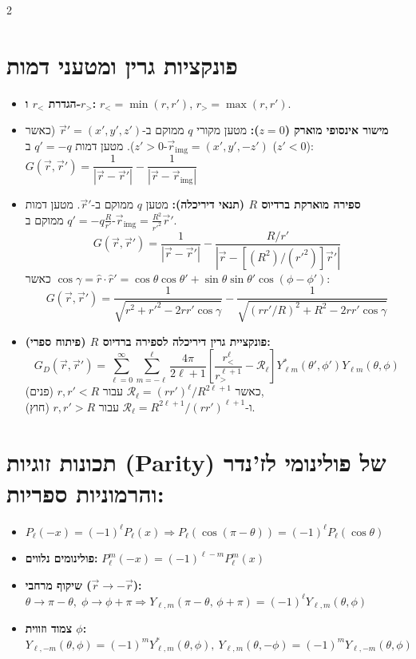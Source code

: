 \documentclass[10pt,a4paper]{article}
\begin{document}
\begin{multicols*}{2}
\section{פונקציות גרין ומטעני דמות}
\begin{itemize}
    \item \textbf{הגדרת $r_<$ ו-$r_>$:} $r_< = \min(r, r')$, \quad $r_> = \max(r, r')$.

    \item \textbf{מישור אינסופי מוארק ($z=0$):} 
    מטען מקורי $q$ ממוקם ב-$\vec{r}' = (x', y', z')$ (כאשר $z' > 0$). מטען דמות $q' = -q$ ב-$\vec{r}_{\text{img}} = (x', y', -z')$ ($z' < 0$):
    $
    G(\vec{r},\vec{r}') = \dfrac{1}{|\vec{r}-\vec{r}'|} - \dfrac{1}{|\vec{r}-\vec{r}_{\text{img}}|}
    $
    

    \item \textbf{ספירה מוארקת ברדיוס $R$ (תנאי דיריכלה):}
    מטען $q$ ממוקם ב-$\vec{r}'$. מטען דמות $q' = -q \frac{R}{r'}$ ממוקם ב-$\vec{r}_{\text{img}} = \frac{R^2}{r'^2}\vec{r}'$.
    \[
    G(\vec{r},\vec{r}') = \frac{1}{|\vec{r}-\vec{r}'|} - \frac{R/r'}{\left|\vec{r} - [(R^2)/(r'^2)]\vec{r}'\right|}
    \]
    כאשר $\cos\gamma = \hat{r}\cdot\hat{r}' = \cos\theta\cos\theta' + \sin\theta\sin\theta'\cos(\phi-\phi')$:
    \[
    G(\vec{r},\vec{r}') = \frac{1}{\sqrt{r^2 + r'^2 - 2rr'\cos\gamma}} - \frac{1}{\sqrt{(rr'/R)^2 + R^2 - 2rr'\cos\gamma}}
    \]

    \item \textbf{פונקציית גרין דיריכלה לספירה ברדיוס $R$ (פיתוח ספרי):}
$$ G_D(\vec{r},\vec{r}') = \sum_{\ell=0}^\infty \sum_{m=-\ell}^\ell \frac{4\pi}{2\ell+1} \left[ \frac{r_<^\ell}{r_>^{\ell+1}} - \mathcal{R}_\ell \right] Y_{\ell m}^*(\theta',\phi') Y_{\ell m}(\theta,\phi) $$
כאשר $\mathcal{R}_\ell = (rr')^\ell / R^{2\ell+1}$ עבור $r,r' < R$ (פנים), \\ ו-$\mathcal{R}_\ell = R^{2\ell+1} / (rr')^{\ell+1}$ עבור $r,r' > R$ (חוץ).
\end{itemize}

\section{תכונות זוגיות (Parity) של פולינומי לז'נדר והרמוניות ספריות:}
\begin{itemize}
    \item $P_\ell(-x) = (-1)^\ell P_\ell(x) \Rightarrow P_\ell(\cos(\pi - \theta)) = (-1)^\ell P_\ell(\cos\theta)$
    \item \textbf{פולינומים נלווים:} $P_\ell^m(-x) = (-1)^{\ell-m} P_\ell^m(x)$
    \item \textbf{שיקוף מרחבי ($\vec{r} \to -\vec{r}$):} $\theta \to \pi - \theta, \; \phi \to \phi + \pi \Rightarrow Y_{\ell,m}(\pi - \theta, \, \phi + \pi) = (-1)^\ell Y_{\ell,m}(\theta, \phi)$
    \item \textbf{צמוד וזווית $\phi$:} $Y_{\ell, -m}(\theta, \phi) = (-1)^m Y_{\ell, m}^*(\theta, \phi), \ Y_{\ell,m}(\theta, -\phi) = (-1)^m Y_{\ell,-m}(\theta, \phi)$
\end{itemize}


\end{multicols*}
\end{document}
